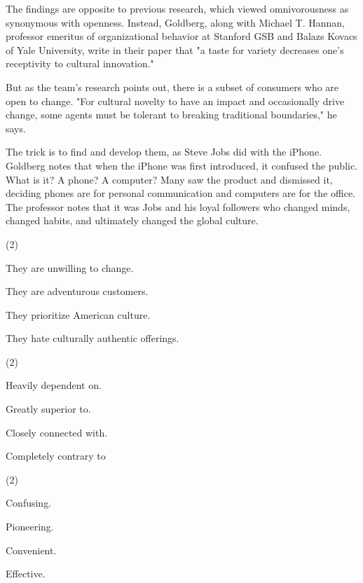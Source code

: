 \documentclass{英语试卷}
\begin{document}
\par The findings are opposite to previous research, which viewed omnivorousness as synonymous with openness. Instead, Goldberg, along with Michael T. Hannan, professor emeritus of organizational behavior at Stanford GSB and Balazs Kovacs of Yale University, write in their paper that "a taste for variety decreases one's receptivity to cultural innovation."\par
\par But as the team's research points out, there is a subset of consumers who are open to change. "For cultural novelty to have an impact and occasionally drive change, some agents must be tolerant to breaking traditional boundaries," he says.\par
\par The trick is to find and develop them, as Steve Jobs did with the iPhone. Goldberg notes that when the iPhone was first introduced, it confused the public. What is it? A phone? A computer? Many saw the product and dismissed it, deciding phones are for personal communication and computers are for the office. The professor notes that it was Jobs and his loyal followers who changed minds, changed habits, and ultimately changed the global culture.\par
{}
\begin{choices}(2)
  \item They are unwilling to change.
  \item They are adventurous customers.
  \item They prioritize American culture.
  \item They hate culturally authentic offerings.
\end{choices}
\begin{choices}(2)
  \item Heavily dependent on.
  \item Greatly superior to.
  \item Closely connected with.
  \item Completely contrary to
\end{choices}
\begin{choices}(2)
  \item Confusing.
  \item Pioneering.
  \item Convenient.
  \item Effective.
\end{choices}
\end{document}
